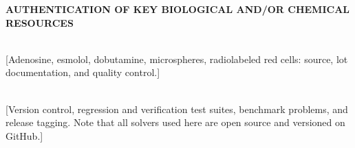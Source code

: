 \documentclass[11pt]{article}
\begin{document}
\textbf{AUTHENTICATION OF KEY BIOLOGICAL AND/OR CHEMICAL RESOURCES}

\\
{}[Adenosine, esmolol, dobutamine, microspheres, radiolabeled red cells: source, lot documentation, and quality control.]

\\
{}[Version control, regression and verification test suites, benchmark problems, and release tagging. Note that all solvers used here are open source and versioned on GitHub.]
\end{document}
